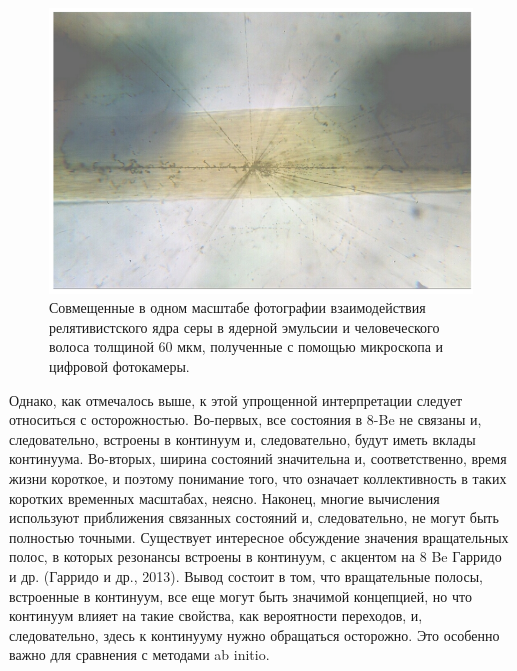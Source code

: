 \documentclass[fontsize=14pt]{scrarticle}
\begin{document}
\begin{figure}[!ht]
\centerline{\includegraphics[scale=.6]{Picture2.png}}
\caption{Совмещенные в одном масштабе фотографии взаимодействия релятивистского ядра серы в ядерной эмульсии и человеческого волоса толщиной 60 мкм, полученные с помощью микроскопа и цифровой фотокамеры.}
\label{fig1}
\end{figure}
Однако, как отмечалось выше, к этой упрощенной интерпретации следует относиться с осторожностью. Во-первых, все состояния в 8-Be не связаны и, следовательно, встроены в континуум и, следовательно, будут иметь вклады континуума. Во-вторых, ширина состояний значительна и, соответственно, время жизни короткое, и поэтому понимание того, что означает коллективность в таких коротких временных масштабах, неясно. Наконец, многие вычисления используют приближения связанных состояний и, следовательно, не могут быть полностью точными. Существует интересное обсуждение значения вращательных полос, в которых резонансы встроены в континуум, с акцентом на 8 Be Гарридо и др. (Гарридо и др., 2013). Вывод состоит в том, что вращательные полосы, встроенные в континуум, все еще могут быть значимой концепцией, но что континуум влияет на такие свойства, как вероятности переходов, и, следовательно, здесь к континууму нужно обращаться осторожно. Это особенно важно для сравнения с методами ab initio.
\end{document}

